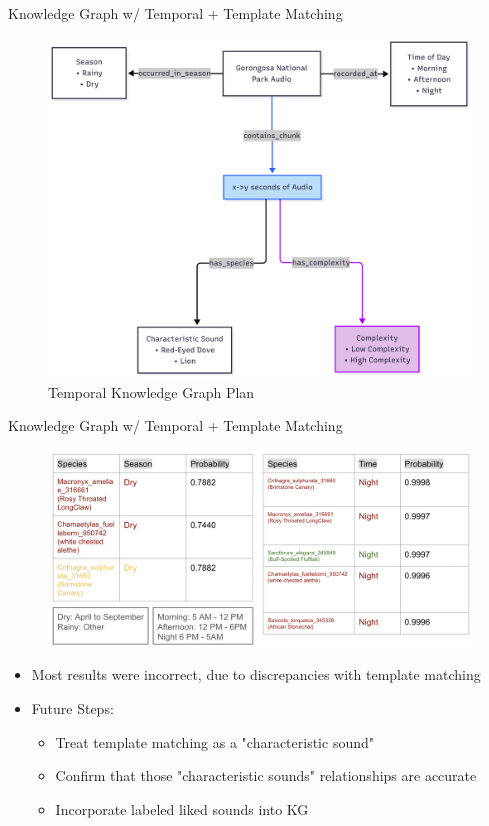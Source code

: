 \begin{frame}{Knowledge Graph w/ Temporal + Template Matching}
    \centering
    \begin{figure}
        \includegraphics[height=\textheight,width=\textwidth,keepaspectratio]{images/temporalKG.jpg}
        \caption{Temporal Knowledge Graph Plan}
    \end{figure} 
\end{frame}

\begin{frame}{Knowledge Graph w/ Temporal + Template Matching}
    \centering
    \begin{figure}
        \includegraphics[scale=0.3]{images/TemporalResults.png}
    \end{figure} 
    \begin{itemize}
        \item Most results were incorrect, due to discrepancies with template matching
        \item Future Steps: 
        \begin{itemize}
            \item Treat template matching as a "characteristic sound"
            \item Confirm that those "characteristic sounds" relationships are accurate
            \item Incorporate labeled liked sounds into KG
        \end{itemize}
    \end{itemize}
\end{frame}

